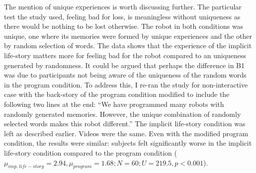 The mention of unique experiences is worth discussing further. The particular test the study used, feeling bad for loss, is meaningless without uniqueness as there would be nothing to be lost otherwise. The robot in both conditions was unique, one where its memories were formed by unique experiences and the other by random selection of words. The data shows that the experience of the implicit life-story matters more for feeling bad for the robot compared to an uniqueness generated by randomness. It could be argued that perhaps the difference in B1 was due to participants not being aware of the uniqueness of the random words in the program condition. To address this, I re-ran the study for non-interactive case with the back-story of the program condition modified to include the following two lines at the end: ``We have programmed many robots with randomly generated memories. However, the unique combination of randomly selected words makes this robot different.'' The implicit life-story condition was left as described earlier. Videos were the same. Even with the modified program condition, the results were similar: subjects felt significantly worse in the implicit life-story condition compared to the program condition ($\mu_{imp.\ life-story}=2.94, \mu_{program}=1.68; N=60; U=219.5, p < 0.001$).












% 


